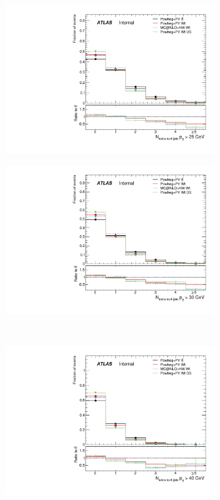 \begin{figure}
\centering
\begin{subfigure}[]{0.45\textwidth}
\includegraphics[width=\textwidth]{fig/MCComp/WtNTruthExtraJets25.pdf}
\end{subfigure}
\begin{subfigure}[]{0.45\textwidth}
\includegraphics[width=\textwidth]{fig/MCComp/WtNTruthExtraJets30.pdf}
\end{subfigure}
\\
\begin{subfigure}[]{0.45\textwidth}
\includegraphics[width=\textwidth]{fig/MCComp/WtNTruthExtraJets40.pdf}

\end{subfigure}
\end{figure}
